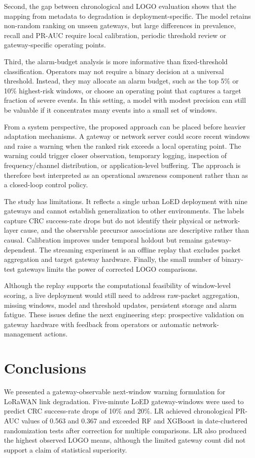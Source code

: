 \documentclass{jot}
\begin{document}
Second, the gap between chronological and LOGO evaluation shows that the mapping from metadata to degradation is deployment-specific. The model retains non-random ranking on unseen gateways, but large differences in prevalence, recall and PR-AUC require local calibration, periodic threshold review or gateway-specific operating points.

Third, the alarm-budget analysis is more informative than fixed-threshold classification. Operators may not require a binary decision at a universal threshold. Instead, they may allocate an alarm budget, such as the top 5\% or 10\% highest-risk windows, or choose an operating point that captures a target fraction of severe events. In this setting, a model with modest precision can still be valuable if it concentrates many events into a small set of windows.

From a system perspective, the proposed approach can be placed before heavier adaptation mechanisms. A gateway or network server could score recent windows and raise a warning when the ranked risk exceeds a local operating point. The warning could trigger closer observation, temporary logging, inspection of frequency/channel distribution, or application-level buffering. The approach is therefore best interpreted as an operational awareness component rather than as a closed-loop control policy.

The study has limitations. It reflects a single urban LoED deployment with nine gateways and cannot establish generalization to other environments. The labels capture CRC success-rate drops but do not identify their physical or network-layer cause, and the observable precursor associations are descriptive rather than causal. Calibration improves under temporal holdout but remains gateway-dependent. The streaming experiment is an offline replay that excludes packet aggregation and target gateway hardware. Finally, the small number of binary-test gateways limits the power of corrected LOGO comparisons.

Although the replay supports the computational feasibility of window-level scoring, a live deployment would still need to address raw-packet aggregation, missing windows, model and threshold updates, persistent storage and alarm fatigue. These issues define the next engineering step: prospective validation on gateway hardware with feedback from operators or automatic network-management actions.

\section{Conclusions}\label{s:6}
We presented a gateway-observable next-window warning formulation for LoRaWAN link degradation. Five-minute LoED gateway-windows were used to predict CRC success-rate drops of 10\% and 20\%. LR achieved chronological PR-AUC values of 0.563 and 0.367 and exceeded RF and XGBoost in date-clustered randomization tests after correction for multiple comparisons. LR also produced the highest observed LOGO means, although the limited gateway count did not support a claim of statistical superiority.
\end{document}
